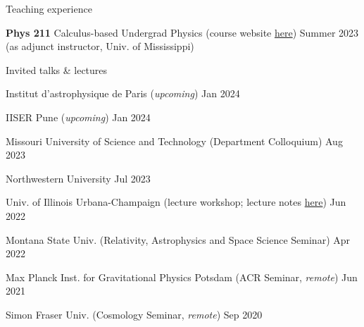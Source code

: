 \documentclass{resume} %
\begin{document}

\begin{rSection}{Teaching experience}


{\bf Phys 211 } Calculus-based Undergrad Physics  (course website
 \href{https://sashwattanay.github.io/site/2023/04/11/phys_211}{here})    \hfill Summer 2023 \\
{  (as adjunct instructor, Univ. of Mississippi)}                                             







\end{rSection}



\begin{rSection}{Invited talks \& lectures}


Institut d'astrophysique de Paris (\textit{upcoming})    \hfill Jan 2024


IISER Pune (\textit{upcoming})       \hfill Jan  2024


Missouri University of Science and Technology (Department Colloquium)       \hfill Aug 2023

Northwestern University              \hfill Jul 2023

Univ. of Illinois Urbana-Champaign (lecture workshop; lecture notes 
\href{https://arxiv.org/abs/2206.05799}{here})       \hfill Jun 2022

Montana State Univ. (Relativity, Astrophysics and Space Science Seminar)        \hfill Apr 2022

Max Planck Inst. for Gravitational Physics Potsdam (ACR Seminar, \textit{remote}) \hfill Jun 2021  

Simon Fraser Univ. (Cosmology Seminar, \textit{remote}) \hfill Sep 2020

\end{rSection}
\end{document}
